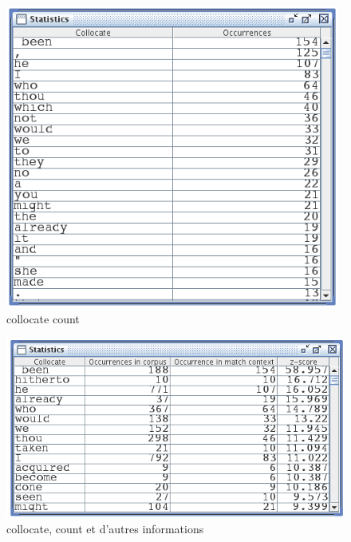 \begin{figure}[!h]
\begin{center}
\includegraphics[width=11cm]{resources/img/fig4-11.png}
\caption{collocate count\label{fig-statistics-mode1}}
\end{center}
\end{figure}

\begin{figure}[!h]
\begin{center}
\includegraphics[width=12cm]{resources/img/fig4-12.png}
\caption{collocate, count et d'autres informations\label{fig-statistics-mode2}}
\end{center}
\end{figure}
